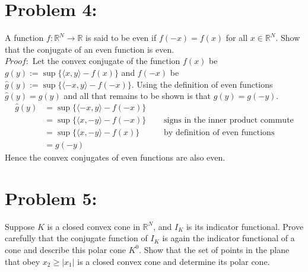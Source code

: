 \documentclass[12pt]{report}
\begin{document}
\section*{Problem 4:}
A function $f:\mathbb{R}^N\to\mathbb{R}$ is said to be even if $f(-x) = f(x)$ for all $x \in \mathbb{R}^N$. Show that the
conjugate of an even function is even.\\
$Proof:$ Let the convex conjugate of the function $f(x)$ be $g(y):=\sup\{\langle x,y\rangle-f(x)\}$ and 
$f(-x)$ be $\hat{g}(y):=\sup\{\langle -x,y\rangle-f(-x)\}$. Using the definition of even functions $\hat{g}(y)=g(y)$ and all that
remains to be shown is that $\hat{g}(y)=g(-y)$.
\begin{align*}
\hat{g}(y)&=\sup\{\langle -x,y\rangle-f(-x)\} \\
	&= \sup\{\langle x,-y\rangle-f(-x)\} \quad &\text{ signs in the inner product commute}\\
	&= \sup\{\langle x,-y\rangle-f(x)\} 	 &\text{ by definition of even functions}\\
	&= g(-y)
\end{align*}
Hence the convex conjugates of even functions are also even.

\section*{Problem 5:}
Suppose $K$ is a closed convex cone in $\mathbb{R}^N$, and $I_K$ is its indicator functional. Prove carefully that the conjugate
function of $I_K$ is again the indicator functional of a cone and describe this polar cone $K^0$. Show that the set of points in
the plane that obey $x_2 \geq |x_1|$ is a closed convex cone and determine its polar cone.
\end{document}
